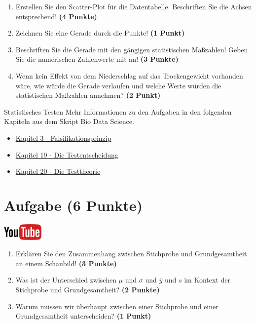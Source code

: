 \documentclass[a4paper, 10pt]{scrartcl}\usepackage[]{graphicx}\usepackage[]{xcolor}
\begin{document}
\begin{enumerate}
\item Erstellen Sie den Scatter-Plot f{\"u}r die Datentabelle. Beschriften Sie
  die Achsen entsprechend! \textbf{(4 Punkte)}
\item Zeichnen Sie eine Gerade durch die Punkte! \textbf{(1 Punkt)}
\item Beschriften Sie die Gerade mit den g{\"a}ngigen statistischen Ma{\ss}zahlen!
  Geben Sie die numerischen Zahlenwerte mit an! \textbf{(3 Punkte)}
\item Wenn kein Effekt von dem Niederschlag auf das Trockengewicht
  vorhanden w{\"a}re, wie w{\"u}rde die Gerade verlaufen und welche Werte w{\"u}rden die
  statistischen Ma{\ss}zahlen annehmen? \textbf{(2 Punkt)}
\end{enumerate} 
\clearpage
\begin{graybox}{Statistisches Testen}
Mehr Informationen zu den Aufgaben in den folgenden Kapiteln aus dem Skript Bio Data Science.
  \begin{itemize}
  \item \href{https://jkruppa.github.io/preface.html#lernziel-3-falsifikationsprinzip}{Kapitel 3 - Falsifikationsprinzip}
  \item \href{https://jkruppa.github.io/stat-tests-basic.html}{Kapitel 19 - Die Testentscheidung}
  \item \href{https://jkruppa.github.io/stat-tests-theorie.html}{Kapitel 20 - Die Testtheorie}
  \end{itemize}
\end{graybox}
\clearpage

\section{Aufgabe \hfill (6 Punkte)}

\hfill\href{https://youtu.be/1S-FuQisTpE}{\includegraphics[width =
  2cm]{img/youtube}}\\[1Ex]

\begin{enumerate}
\item Erkl{\"a}ren Sie den Zusammenhang zwischen Stichprobe und Grundgesamtheit
  an einem Schaubild! \textbf{(3 Punkte)}
\item Was ist der Unterschied zwischen $\mu$ und $\sigma$ und $\bar{y}$ und
  $s$ im Kontext der Stichprobe und Grundgesamtheit? \textbf{(2 Punkte)}
\item Warum m{\"u}ssen wir {\"u}berhaupt zwischen einer Stichprobe und einer
  Grundgesamtheit unterscheiden? \textbf{(1 Punkt)}
\end{enumerate} 
\clearpage
\end{document}
